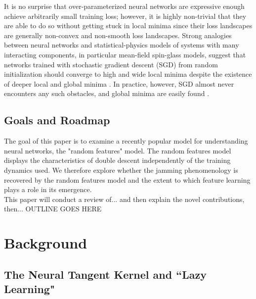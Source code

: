\documentclass[a4paper, 12pt]{article}
\begin{document}
It is no surprise that over-parameterized neural networks are expressive enough achieve arbitrarily small training loss; however, it is highly non-trivial that they are able to do so without getting stuck in local minima since their loss landscapes are generally non-convex and non-smooth loss landscapes. Strong analogies between neural networks and statistical-physics models of systems with many interacting components, in particular mean-field spin-glass models, suggest that networks trained with stochastic gradient descent (SGD) from random initialization should converge to high and wide local minima despite the existence of deeper local and global minima \cite{choromanskaLossSurfacesMultilayer}. In practice, however, SGD almost never encounters any such obstacles, and global minima are easily found \cite{goodfellowQualitativelyCharacterizingNeural2015}.

\subsection{Goals and Roadmap}

The goal of this paper is to examine a recently popular model for understanding neural networks, the "random features" model. The random features model displays the characteristics of double descent independently of the training dynamics used. We therefore explore whether the jamming phenomenology is recovered by the random features model and the extent to which feature learning plays a role in its emergence.\\


This paper will conduct a review of... and then explain the novel contributions, then... OUTLINE GOES HERE

\section{Background}
\subsection{The Neural Tangent Kernel and ``Lazy Learning"}
\end{document}

